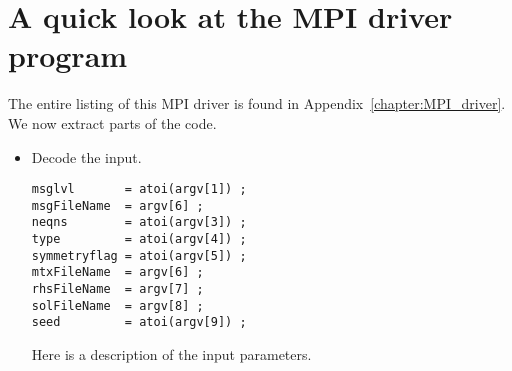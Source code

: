 \section{A quick look at the MPI driver program}
\label{section:BridgeMPI:quick-look-MPI-driver}
\par
The entire listing of this MPI driver is found in
Appendix~\ref{chapter:MPI_driver}.
We now extract parts of the code.
\begin{itemize}
\item Decode the input.
\par
\begin{verbatim}
msglvl       = atoi(argv[1]) ;
msgFileName  = argv[6] ;
neqns        = atoi(argv[3]) ;
type         = atoi(argv[4]) ;
symmetryflag = atoi(argv[5]) ;
mtxFileName  = argv[6] ;
rhsFileName  = argv[7] ;
solFileName  = argv[8] ;
seed         = atoi(argv[9]) ;
\end{verbatim}
Here is a description of the input parameters.


\end{itemize}
